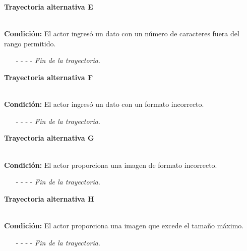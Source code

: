 \hypertarget{CU11-1-1-1:TAE}{\textbf{Trayectoria alternativa E}}\\
\noindent \textbf{Condición:} El actor ingresó un dato con un número de caracteres fuera del rango permitido.
\begin{enumerate}
	\UCpaso[\UCsist] Muestra el mensaje  señalando el campo que presenta el error en la pantalla .
	\UCpaso Regresa al paso \ref{CU11.1.1-P3} de la trayectoria principal.
	\item[- -] - - {\em {Fin de la trayectoria}}.%
\end{enumerate}
\hypertarget{CU11-1-1-1:TAF}{\textbf{Trayectoria alternativa F}}\\
\noindent \textbf{Condición:} El actor ingresó un dato con un formato incorrecto.
\begin{enumerate}
	\UCpaso[\UCsist] Muestra el mensaje  señalando el campo que presenta el error en la pantalla .
	\UCpaso Regresa al paso \ref{CU11.1.1-P3} de la trayectoria principal.
	\item[- -] - - {\em {Fin de la trayectoria}}.
\end{enumerate}
\hypertarget{CU11-1-1-1:TAG}{\textbf{Trayectoria alternativa G}}\\
\noindent \textbf{Condición:} El actor proporciona una imagen de formato incorrecto.
\begin{enumerate}
	\UCpaso[\UCsist] Muestra el mensaje  señalando el campo que presenta el error en la pantalla .
	\UCpaso Regresa al paso \ref{CU11.1.1-P3} de la trayectoria principal.
	\item[- -] - - {\em {Fin de la trayectoria}}.
\end{enumerate}
\hypertarget{CU11-1-1-1:TAH}{\textbf{Trayectoria alternativa H}}\\
\noindent \textbf{Condición:} El actor proporciona una imagen que excede el tamaño máximo.
\begin{enumerate}
	\UCpaso[\UCsist] Muestra el mensaje  señalando el campo que presenta el error en la pantalla .
	\UCpaso Regresa al paso \ref{CU11.1.1-P3} de la trayectoria principal.
	\item[- -] - - {\em {Fin de la trayectoria}}.
\end{enumerate}

